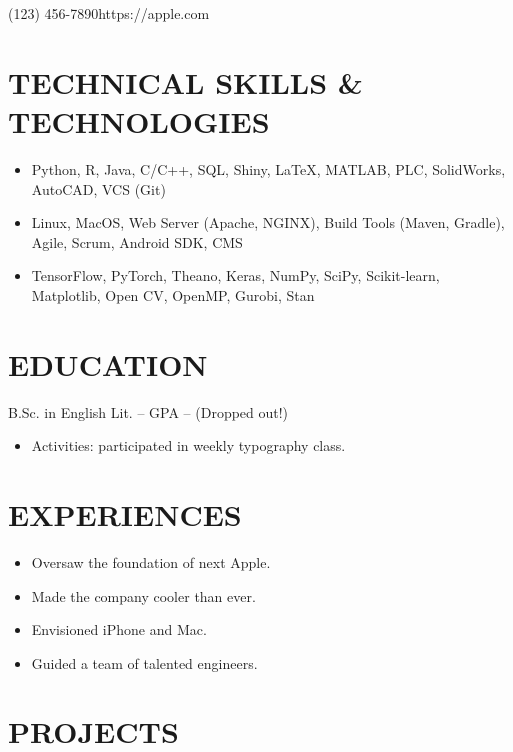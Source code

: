 \documentclass{ziba_resume}
\begin{document}
 {(123) 456-7890}{https://apple.com}

\section{TECHNICAL SKILLS \& TECHNOLOGIES}
\begin{itemize}
    \item Python, R, Java, C/C++, SQL, Shiny, LaTeX,     MATLAB, PLC, SolidWorks, AutoCAD, VCS (Git)
    \item Linux, MacOS, Web Server (Apache, NGINX), Build Tools (Maven, Gradle), Agile, Scrum, Android SDK, CMS 
    \item TensorFlow, PyTorch, Theano, Keras, NumPy, SciPy, Scikit-learn, Matplotlib, Open CV, OpenMP, Gurobi, Stan
\end{itemize}

\section{EDUCATION}
B.Sc. in English Lit. -- GPA -- (Dropped out!)
\begin{itemize}
    \item Activities: participated in weekly typography class.
\end{itemize}



\section{EXPERIENCES}
\begin{itemize}
    \item Oversaw the foundation of next Apple.
    \item Made the company cooler than ever.
\end{itemize}

\begin{itemize}
    \item Envisioned iPhone and Mac.
    \item Guided a team of talented engineers.
\end{itemize}

\section{PROJECTS}
\end{document}
